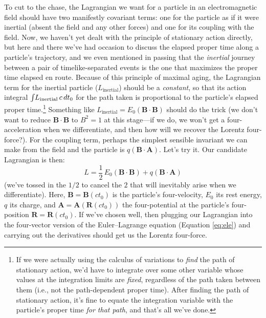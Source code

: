 \documentclass[12pt]{article}
\renewcommand{\vv}[1]{\mathbf{#1}}
\begin{document}
To cut to the chase, the Lagrangian we want for a particle in an electromagnetic field should have two manifestly covariant terms: one for the particle as if it were inertial (absent the field and any other forces) and one for its coupling with the field. Now, we haven't yet dealt with the principle of stationary action directly, but here and there we've had occasion to discuss the elapsed proper time along a particle's trajectory, and we even mentioned in passing that the \emph{inertial} journey between a pair of timelike-separated events is the one that maximizes the proper time elapsed en route. Because of this principle of maximal aging, the Lagrangian term for the inertial particle ($L_{\textrm{inertial}}$) should be a \emph{constant}, so that its action integral $\int \mkern-4mu L_{\textrm{inertial}} \, c \, dt_0$ for the path taken is proportional to the particle's elapsed proper time.\footnote{If we were actually using the calculus of variations to \emph{find} the path of stationary action, we'd have to integrate over some other variable whose values at the integration limits are \emph{fixed}, regardless of the path taken between them (i.e., not the path-dependent proper time). After finding the path of stationary action, it's fine to equate the integration variable with the particle's proper time \emph{for that path}, and that's all we've done.} Something like $L_{\textrm{inertial}} = E_0 (\vv B \cdot \vv B)$ should do the trick (we don't want to reduce $\vv B \cdot \vv B$ to $B^2 = 1$ at this stage---if we do, we won't get a four-acceleration when we differentiate, and then how will we recover the Lorentz four-force?). For the coupling term, perhaps the simplest sensible invariant we can make from the field and the particle is $q (\vv B \cdot \vv A)$. Let's try it. Our candidate Lagrangian is then:
\begin{equation*}
L = \dfrac{1}{2} \, E_0 (\vv B \cdot \vv B) + q (\vv B \cdot \vv A)
\end{equation*}
(we've tossed in the $1/2$ to cancel the $2$ that will inevitably arise when we differentiate). Here, $\vv B = \vv B (ct_0)$ is the particle's four-velocity, $E_0$ its rest energy, $q$ its charge, and $\vv A = \vv A (\vv R (ct_0))$ the four-potential at the particle's four-position $\vv R = \vv R (ct_0)$. If we've chosen well, then plugging our Lagrangian into the four-vector version of the Euler--Lagrange equation (Equation \ref{eq:ele}) and carrying out the derivatives should get us the Lorentz four-force.
\end{document}
